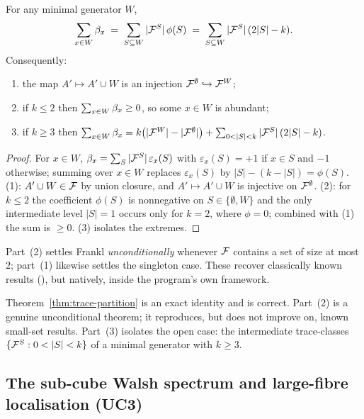 \begin{theorem}
\label{thm:trace-partition}
For any minimal generator $W$,
\[
  \sum_{x\in W}\beta_x \;=\; \sum_{S\subseteq W}|\mathcal{F}^S|\,\phi(S)
  \;=\;\sum_{S\subseteq W}|\mathcal{F}^S|\,(2|S|-k).
\]
Consequently:
\begin{enumerate}[label=\textup{(\arabic*)},leftmargin=2.4em]
\item the map $A'\mapsto A'\cup W$ is an injection
  $\mathcal{F}^\emptyset\hookrightarrow\mathcal{F}^W$;
\item if $k\le2$ then $\sum_{x\in W}\beta_x\ge0$, so some $x\in W$ is
  abundant;
\item if $k\ge3$ then
  $\sum_{x\in W}\bias_x=k\bigl(|\F^W|-|\F^\emptyset|\bigr)
   +\sum_{0<|S|<k}|\F^S|\,(2|S|-k)$.
\end{enumerate}
\end{theorem}

\begin{proof}
For $x\in W$, $\beta_x=\sum_S|\mathcal{F}^S|\,\varepsilon_x(S)$ with
$\varepsilon_x(S)=+1$ if $x\in S$ and $-1$ otherwise; summing over
$x\in W$ replaces $\varepsilon_x(S)$ by $|S|-(k-|S|)=\phi(S)$. (1):
$A'\cup W\in\mathcal{F}$ by union closure, and $A'\mapsto A'\cup W$ is injective
on $\mathcal{F}^\emptyset$. (2): for $k\le2$ the coefficient $\phi(S)$ is
nonnegative on $S\in\{\emptyset,W\}$ and the only intermediate level
$|S|=1$ occurs only for $k=2$, where $\phi=0$; combined with (1) the
sum is $\ge0$. (3) isolates the extremes.
\end{proof}

Part~(2) settles Frankl \emph{unconditionally} whenever $\mathcal{F}$ contains a
set of size at most $2$; part~(1) likewise settles the singleton case.
These recover classically known results (\cite{bruhn-schaudt}), but
natively, inside the program's own framework.

\begin{status}
Theorem~\ref{thm:trace-partition} is an exact identity and is correct.
Part~(2) is a genuine unconditional theorem; it reproduces, but does not
improve on, known small-set results. Part~(3) isolates the open case:
the intermediate trace-classes $\{\F^S:0<|S|<k\}$ of a minimal
generator with $k\ge3$.
\end{status}

\subsection{The sub-cube Walsh spectrum and large-fibre localisation (UC3)}
\label{ssec:uc3}

